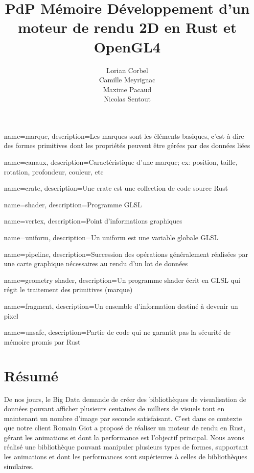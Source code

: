 \documentclass[12pt]{article}
\title{\gls{PdP} \smallbreak Mémoire \medbreak Développement d'un moteur de rendu 2D en Rust et OpenGL4 }
\author{Lorian Corbel \\ Camille Meyrignac \\ Maxime Pacaud \\ Nicolas Sentout}
\begin{document}

{
    name=marque,
    description={Les marques sont les éléments basiques, c'est à dire des formes primitives dont les
    propriétés peuvent être gérées par des données liées}
}

{
    name=canaux,
    description={Caractéristique d'une marque; ex: position, taille, rotation, profondeur, couleur, etc}
}

{
    name=crate,
    description={Une crate est une collection de code source Rust}
}

{
    name=shader,
    description={Programme GLSL}
}

{
    name=vertex,
    description={Point d'informations graphiques}
}

{
    name=uniform,
    description={Un uniform est une variable globale GLSL}
}

{
    name=pipeline,
    description={Succession des opérations généralement réalisées par une carte graphique nécessaires au
    rendu d'un lot de données}
}

{
    name={geometry shader},
    description={Un programme shader écrit en GLSL qui régit le traitement des primitives (marque)}
}

{
    name={fragment},
    description={Un ensemble d'information destiné à devenir un pixel}
}

{
    name={unsafe},
    description={Partie de code qui ne garantit pas la sécurité de mémoire promis par Rust}
}

\maketitle
\tableofcontents
\newpage

\section{Résumé}

De nos jours, le Big Data demande de créer des bibliothèques de visualisation de données pouvant afficher plusieurs centaines de milliers de visuels 
tout en maintenant un nombre d'image par seconde satisfaisant.
C'est dans ce contexte que notre client Romain Giot a proposé de réaliser un moteur de rendu en Rust, gérant les animations et dont la performance est 
l'objectif principal. Nous avons réalisé une bibliothèque pouvant manipuler plusieurs types de formes, supportant les animations et dont les 
performances sont supérieures à celles de bibliothèques similaires.
\end{document}
